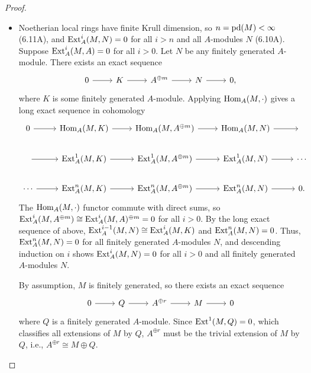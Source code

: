 \documentclass[a4paper]{article}
\begin{document}
\begin{enumerate} [label=\textbf{\arabic*.}, leftmargin=0em]
        \begin{proof} $ $ \vspace{0pt}
          \begin{itemize} [leftmargin=0cm]
            \item[(a)] Noetherian local rings have finite Krull dimension, so $n = \operatorname{pd}(M) < \infty$ (6.11A), and $\operatorname{Ext}_A^i(M, N) = 0$ for all $i > n$ and all $A$-modules $N$ (6.10A).
                  Suppose $\operatorname{Ext}_A^i(M, A) = 0$ for all $i > 0$.
                  Let $N$ be any finitely generated $A$-module.
                  There exists an exact sequence
                  \[ \begin{tikzcd}
                      0 \arrow[r] & K \arrow[r] & A^{\oplus m} \arrow[r] & N \arrow[r] & 0,
                    \end{tikzcd} \]
                  where $K$ is some finitely generated $A$-module.
                  Applying $\operatorname{Hom}_A(M, \cdot)$ gives a long exact sequence in cohomology
                  \[ \begin{tikzcd}
                      0 \arrow[r]  & {\Hom_A(M,K)} \arrow[r]   & {\Hom_A(M,A^{\oplus m})} \arrow[r] & {\Hom_A(M,N)} \arrow[r]   & {}     \\
                      {} \arrow[r] & {\Ext_A^1(M,K)} \arrow[r] & {\Ext_A^1(M,A^{\oplus m})} \arrow[r] & {\Ext_A^1(M,N)} \arrow[r] & \cdots \\
                      \cdots \arrow[r] & {\Ext_A^n(M,K)} \arrow[r] & {\Ext_A^n(M,A^{\oplus m})} \arrow[r] & {\Ext_A^n(M,N)} \arrow[r] & 0.
                    \end{tikzcd} \]
                  The $\operatorname{Hom}_A(M, \cdot)$ functor commute with direct sums, so $\operatorname{Ext}_A^i(M, A^{\oplus m}) \cong \operatorname{Ext}_A^i(M, A)^{\oplus m} = 0$ for all $i > 0$.
                  By the long exact sequence of above, $\operatorname{Ext}_A^{i - 1}(M, N) \cong \operatorname{Ext}_A^i(M, K)$ and $\operatorname{Ext}_A^n(M, N) = 0$.
                  Thus, $\operatorname{Ext}_A^n(M, N) = 0$ for all finitely generated $A$-modules $N$, and descending induction on $i$ shows $\operatorname{Ext}_A^i(M, N) = 0$ for all $i > 0$ and all finitely generated $A$-modules $N$.

                  By assumption, $M$ is finitely generated, so there exists an exact sequence
                  \[ \begin{tikzcd}
                      0 \arrow[r] & Q \arrow[r] & A^{\oplus r} \arrow[r] & M \arrow[r] & 0
                    \end{tikzcd} \]
                  where $Q$ is a finitely generated $A$-module.
                  Since $\operatorname{Ext}^1(M, Q) = 0$, which classifies all extensions of $M$ by $Q$, $A^{\oplus r}$ must be the trivial extension of $M$ by $Q$, i.e., $A^{\oplus r} \cong M \oplus Q$.


\end{itemize}
\end{proof}
\end{enumerate}
\end{document}
